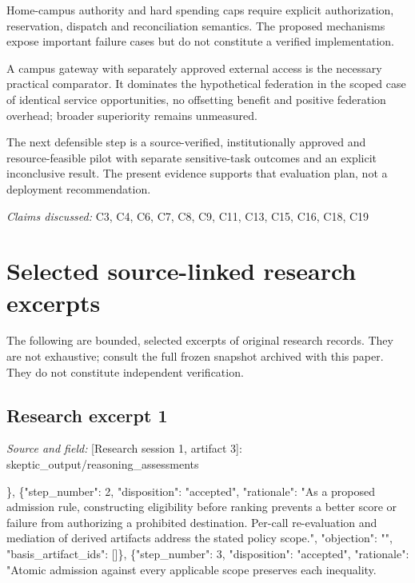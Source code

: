 \documentclass[11pt]{article}
\begin{document}
Home-campus authority and hard spending caps require explicit authorization, reservation, dispatch and reconciliation semantics. The proposed mechanisms expose important failure cases but do not constitute a verified implementation.

A campus gateway with separately approved external access is the necessary practical comparator. It dominates the hypothetical federation in the scoped case of identical service opportunities, no offsetting benefit and positive federation overhead; broader superiority remains unmeasured.

The next defensible step is a source-verified, institutionally approved and resource-feasible pilot with separate sensitive-task outcomes and an explicit inconclusive result. The present evidence supports that evaluation plan, not a deployment recommendation.

\textit{Claims discussed: }C3, C4, C6, C7, C8, C9, C11, C13, C15, C16, C18, C19
\appendix
\section{Selected source-linked research excerpts}
The following are bounded, selected excerpts of original research records. They are not exhaustive; consult the full frozen snapshot archived with this paper. They do not constitute independent verification.
\subsection{Research excerpt 1}
\textit{Source and field: }[Research session 1, artifact 3]: skeptic\_output/reasoning\_assessments\par
[\{"step\_number": 1, "disposition": "unresolved", "rationale": "The attribution matches the supplied project description, and the separation of published gateway claims from proposed extensions is appropriate. No original source establishes those capabilities here.", "objection": "The entry is labeled an assumption, but the published-capability premise is not one of the five explicit conditions of the ledger claim. Retain it as unverified background, not an established premise.

The ledger proof does not require it.", "basis\_artifact\_ids": []\}, \{"step\_number": 2, "disposition": "accepted", "rationale": "As a proposed admission rule, constructing eligibility before ranking prevents a better score or failure from authorizing a prohibited destination. Per-call re-evaluation and mediation of derived artifacts address the stated policy scope.", "objection": "", "basis\_artifact\_ids": []\}, \{"step\_number": 3, "disposition": "accepted", "rationale": "Atomic admission against every applicable scope preserves each inequality.
\end{document}
